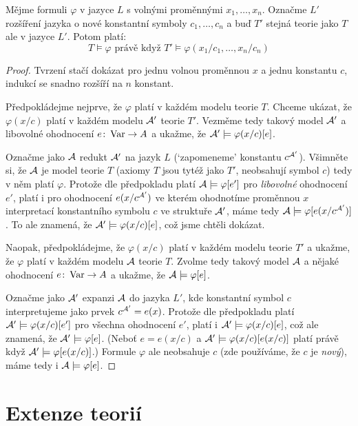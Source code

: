 \begin{theorem}[O konstantách]\label{theorem:on-constants}
    Mějme formuli $\varphi$ v jazyce $L$ s volnými proměnnými $x_1,\dots,x_n$. Označme $L'$ rozšíření jazyka o nové konstantní symboly $c_1,\dots,c_n$ a buď $T'$ stejná teorie jako $T$ ale v jazyce $L'$. Potom platí:
    $$
    T\models\varphi\text{ právě když }T'\models\varphi(x_1/c_1,\dots,x_n/c_n)
    $$
\end{theorem}
\begin{proof}
    Tvrzení stačí dokázat pro jednu volnou proměnnou $x$ a jednu konstantu $c$, indukcí se snadno rozšíří na $n$ konstant.
    
    Předpokládejme nejprve, že $\varphi$ platí v každém modelu teorie $T$. Chceme ukázat, že $\varphi(x/c)$ platí v každém modelu $\mathcal{A}'$ teorie $T'$. Vezměme tedy takový model $\mathcal{A}'$ a libovolné ohodnocení $e\colon\operatorname{Var}\to A$ a ukažme, že $\mathcal{A}'\models\varphi(x/c)[e]$.

    Označme jako $\mathcal{A}$ redukt $\mathcal{A}'$ na jazyk $L$ (`zapomeneme' konstantu $c^{\mathcal{A}'}$). Všimněte si, že $\mathcal{A}$ je model teorie $T$ (axiomy $T$ jsou tytéž jako $T'$, neobsahují symbol $c$) tedy v něm platí $\varphi$. Protože dle předpokladu platí $\mathcal{A}\models\varphi[e']$ pro \emph{libovolné} ohodnocení $e'$, platí i pro ohodnocení $e(x/c^{\mathcal{A}'})$ ve kterém ohodnotíme proměnnou $x$ interpretací konstantního symbolu $c$ ve struktuře $\mathcal{A}'$, máme tedy $\mathcal{A}\models\varphi[e(x/c^{\mathcal{A}'})]$. To ale znamená, že $\mathcal{A}'\models\varphi(x/c)[e]$, což jsme chtěli dokázat.
    
    Naopak, předpokládejme, že $\varphi(x/c)$ platí v každém modelu teorie $T'$ a ukažme, že $\varphi$ platí v každém modelu $\mathcal{A}$ teorie $T$. Zvolme tedy takový model $\mathcal{A}$ a nějaké ohodnocení $e\colon\operatorname{Var}\to A$ a ukažme, že $\mathcal{A}\models\varphi[e]$.

    Označme jako $\mathcal{A}'$ expanzi $\mathcal{A}$ do jazyka $L'$, kde konstantní symbol $c$ interpretujeme jako prvek $c^{\mathcal{A}'}=e(x)$. Protože dle předpokladu platí $\mathcal{A}'\models\varphi(x/c)[e']$ pro všechna ohodnocení $e'$, platí i $\mathcal{A}'\models\varphi(x/c)[e]$, což ale znamená, že $\mathcal{A}'\models\varphi[e]$. (Neboť $e=e(x/c)$ a $\mathcal{A}'\models\varphi(x/c)[e(x/c)]$ platí právě když $\mathcal{A}'\models\varphi[e(x/c)]$.) Formule $\varphi$ ale neobsahuje $c$ (zde používáme, že $c$ je \emph{nový}), máme tedy i $\mathcal{A}\models\varphi[e]$.
\end{proof}


\section{Extenze teorií}

